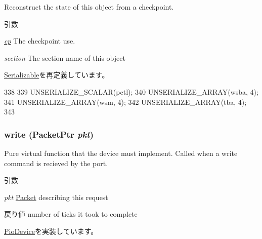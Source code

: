 \label{classTsunamiPChip_af22e5d6d660b97db37003ac61ac4ee49}
Reconstruct the state of this object from a checkpoint. 
\begin{DoxyParams}{引数}
\item[{\em \hyperlink{namespacecp}{cp}}]The checkpoint use. \item[{\em section}]The section name of this object \end{DoxyParams}


\hyperlink{classSerializable_af100c4e9feabf3cd918619c88c718387}{Serializable}を再定義しています。


\begin{DoxyCode}
338 {
339     UNSERIALIZE_SCALAR(pctl);
340     UNSERIALIZE_ARRAY(wsba, 4);
341     UNSERIALIZE_ARRAY(wsm, 4);
342     UNSERIALIZE_ARRAY(tba, 4);
343 }
\end{DoxyCode}
\hypertarget{classTsunamiPChip_a4cefab464e72b5dd42c003a0a4341802}{
\subsubsection[{write}]{ write ({\bf PacketPtr} {\em pkt})}}
\label{classTsunamiPChip_a4cefab464e72b5dd42c003a0a4341802}
Pure virtual function that the device must implement. Called when a write command is recieved by the port. 
\begin{DoxyParams}{引数}
\item[{\em pkt}]\hyperlink{classPacket}{Packet} describing this request \end{DoxyParams}
\begin{DoxyReturn}{戻り値}
number of ticks it took to complete 
\end{DoxyReturn}


\hyperlink{classPioDevice_afe8371668d023bb2516b286e5e399b6f}{PioDevice}を実装しています。


